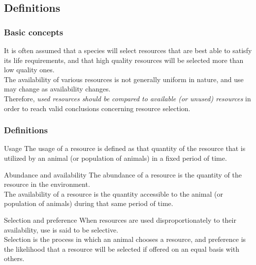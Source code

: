 \documentclass[10pt]{beamer}
\begin{document}
\subsection{Definitions}
\begin{frame}
\frametitle{Basic concepts}

It is often assumed that a species will select
resources that are best able to satisfy its life requirements, and that high quality
resources will be selected more than low quality ones.\\
\vspace{0.5cm}
The availability of various
resources is not generally uniform in nature, and use may change as availability
changes.\\
\vspace{0.5cm}
Therefore, {\it used resources should be compared to available (or unused)
resources} in order to reach valid conclusions concerning resource selection.

\end{frame}

\begin{frame}
\frametitle{Definitions}


\begin{block}{Usage}
The usage of a resource is defined as that quantity of the resource that is utilized
by an animal (or population of animals) in a fixed period of time.
\end{block}

\begin{block}{Abundance and availability}
The abundance of a resource is the quantity of the resource in the environment.\\
The availability of
a resource is the quantity accessible to the animal (or population of animals) during that
same period of time.
\end{block}

\begin{block}{Selection and preference}
When
resources are used disproportionately to their availability, use is said to be selective.\\
Selection is the process in which an animal chooses a resource, and
preference is the likelihood that a resource will be selected if offered on an equal basis
with others.
\end{block}


\end{frame}
\end{document}
